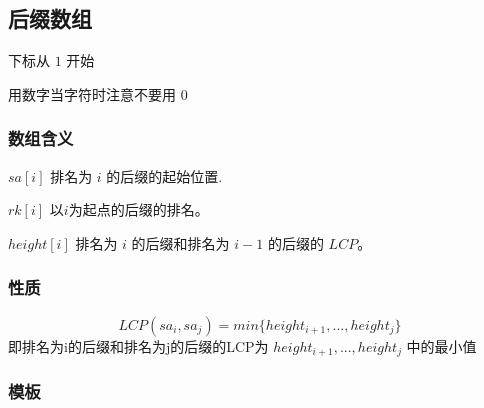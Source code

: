 \documentclass[
]{article}
\begin{document}
\hypertarget{ux540eux7f00ux6570ux7ec4}{%
\subsection{后缀数组}\label{ux540eux7f00ux6570ux7ec4}}

下标从 \(1\) 开始

用数字当字符时注意不要用 \(0\)

\hypertarget{ux6570ux7ec4ux542bux4e49}{%
\subsubsection{数组含义}\label{ux6570ux7ec4ux542bux4e49}}

\(sa[i]\) 排名为 \(i\) 的后缀的起始位置.

\(rk[i]\) 以\(i\)为起点的后缀的排名。

\(height[i]\) 排名为 \(i\) 的后缀和排名为 \(i-1\) 的后缀的 \(LCP\)。

\hypertarget{ux6027ux8d28}{%
\subsubsection{性质}\label{ux6027ux8d28}}

\[LCP(sa_{i},sa_{j})=min\{height_{i+1},...,height_{j}\}\]
即排名为i的后缀和排名为j的后缀的LCP为 \(height_{i+1},...,height_{j}\)
中的最小值

\hypertarget{ux6a21ux677f-6}{%
\subsubsection{模板}\label{ux6a21ux677f-6}}
\end{document}
